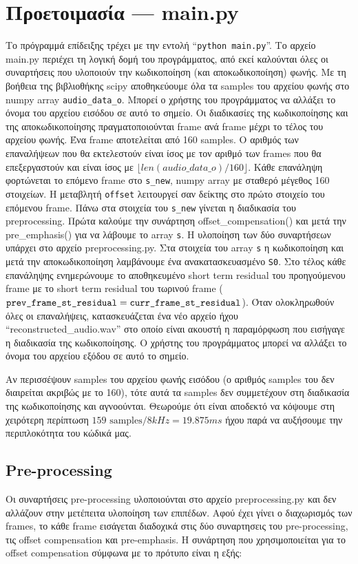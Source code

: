 \documentclass{article}
\begin{document}
\section{Προετοιμασία --- main.py}
Το πρόγραμμά επίδειξης τρέχει με την εντολή ``\verb|python main.py|''. Το αρχείο
main.py περιέχει τη λογική δομή του προγράμματος, από εκεί
καλούνται όλες οι συναρτήσεις που υλοποιούν την κωδικοποίηση (και 
αποκωδικοποίηση) φωνής. Με τη βοήθεια της βιβλιοθήκης scipy αποθηκεύουμε 
όλα τα samples του αρχείου φωνής στο numpy array \verb|audio_data_o|. 
Μπορεί ο χρήστης του προγράμματος να αλλάξει το όνομα του αρχείου 
εισόδου σε αυτό το σημείο. Οι διαδικασίες της κωδικοποίησης και της αποκωδικοποίησης 
πραγματοποιούνται frame ανά frame μέχρι το τέλος του αρχείου φωνής. 
Ένα frame αποτελείται από 160 samples. Ο αριθμός των επαναλήψεων που 
θα εκτελεστούν είναι ίσος με τον αριθμό των frames που θα επεξεργαστούν 
και είναι ίσος με $\lfloor len(audio\_data\_o) / 160 \rfloor$. Κάθε 
επανάληψη φορτώνεται το
επόμενο frame στο \verb|s_new|, numpy array με σταθερό μέγεθος 160
στοιχείων. Η μεταβλητή \verb|offset| λειτουργεί σαν δείκτης στο 
πρώτο στοιχείο του επόμενου frame. Πάνω στα στοιχεία του \verb|s_new| γίνεται 
η διαδικασία του preprocessing. Πρώτα καλούμε την συνάρτηση offset\_compensation()
και μετά την pre\_emphasis() για να λάβουμε το array \verb|s|. Η υλοποίηση
των δύο συναρτήσεων υπάρχει στο αρχείο preprocessing.py. Στα στοιχεία του
array \verb|s| η κωδικοποίηση
και μετά την αποκωδικοποίηση λαμβάνουμε ένα ανακατασκευασμένο \verb|S0|.
Στο τέλος κάθε επανάληψης ενημερώνουμε το αποθηκευμένο short term
residual του προηγούμενου frame με το short term residual του
τωρινού frame ($\verb|prev_frame_st_residual| = \verb|curr_frame_st_residual|$). 
Όταν ολοκληρωθούν όλες οι επαναλήψεις, κατασκευάζεται ένα νέο αρχείο ήχου 
``reconstructed\_audio.wav'' στο οποίο είναι ακουστή η 
παραμό\-ρφωση που εισήγαγε η διαδικασία της κωδικοποίησης.
Ο χρήστης του προγράμματος μπορεί να
αλλάξει το όνομα του αρχείου εξόδου σε αυτό το σημείο. 

Αν περισσέψουν samples του αρχείου φωνής 
εισόδου (ο αριθμός samples του δεν διαιρείται ακριβώς με το 160),
τότε αυτά τα samples δεν συμμετέχουν στη διαδικασία της κωδικοποίησης
και αγνοούνται. Θεωρούμε ότι είναι αποδεκτό να κόψουμε στη 
χειρότερη περίπτωση $159 \text{ samples} / 8 kHz = 19.875 ms$ ήχου
παρά να αυξήσουμε την περιπλοκότητα του κώδικά μας. 

\subsection{Pre-processing}\label{preprocessing}
Οι συναρτήσεις pre-processing υλοποιούνται στο αρχείο 
preprocessing.py και δεν αλλάζουν στην μετέπειτα υλοποίηση των 
επιπέδων\@.
Αφού έχει γίνει ο διαχωρισμός των frames, το κάθε frame εισάγεται διαδοχικά 
στις δύο συναρτησεις του pre-processing, τις
offset compensation και pre-emphasis. Η συνάρτηση που χρησιμοποιείται για το 
offset compensation σύμφωνα με το πρότυπο είναι η εξής:
\end{document}
